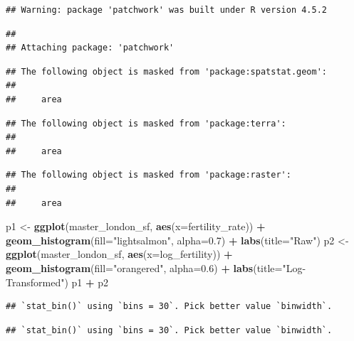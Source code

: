 \documentclass[
]{article}
\newenvironment{Shaded}{\begin{snugshade}}{\end{snugshade}}
\newcommand{\AttributeTok}[1]{\textcolor[rgb]{0.13,0.29,0.53}{#1}}
\newcommand{\FloatTok}[1]{\textcolor[rgb]{0.00,0.00,0.81}{#1}}
\newcommand{\FunctionTok}[1]{\textcolor[rgb]{0.13,0.29,0.53}{\textbf{#1}}}
\newcommand{\NormalTok}[1]{#1}
\newcommand{\OtherTok}[1]{\textcolor[rgb]{0.56,0.35,0.01}{#1}}
\newcommand{\SpecialCharTok}[1]{\textcolor[rgb]{0.81,0.36,0.00}{\textbf{#1}}}
\newcommand{\StringTok}[1]{\textcolor[rgb]{0.31,0.60,0.02}{#1}}
\begin{document}
\begin{verbatim}
## Warning: package 'patchwork' was built under R version 4.5.2
\end{verbatim}

\begin{verbatim}
## 
## Attaching package: 'patchwork'
\end{verbatim}

\begin{verbatim}
## The following object is masked from 'package:spatstat.geom':
## 
##     area
\end{verbatim}

\begin{verbatim}
## The following object is masked from 'package:terra':
## 
##     area
\end{verbatim}

\begin{verbatim}
## The following object is masked from 'package:raster':
## 
##     area
\end{verbatim}

\begin{Shaded}
\begin{Highlighting}[]
\NormalTok{p1 }\OtherTok{\textless{}{-}} \FunctionTok{ggplot}\NormalTok{(master\_london\_sf, }\FunctionTok{aes}\NormalTok{(}\AttributeTok{x=}\NormalTok{fertility\_rate)) }\SpecialCharTok{+} \FunctionTok{geom\_histogram}\NormalTok{(}\AttributeTok{fill=}\StringTok{"lightsalmon"}\NormalTok{, }\AttributeTok{alpha=}\FloatTok{0.7}\NormalTok{) }\SpecialCharTok{+} \FunctionTok{labs}\NormalTok{(}\AttributeTok{title=}\StringTok{"Raw"}\NormalTok{)}
\NormalTok{p2 }\OtherTok{\textless{}{-}} \FunctionTok{ggplot}\NormalTok{(master\_london\_sf, }\FunctionTok{aes}\NormalTok{(}\AttributeTok{x=}\NormalTok{log\_fertility)) }\SpecialCharTok{+} \FunctionTok{geom\_histogram}\NormalTok{(}\AttributeTok{fill=}\StringTok{"orangered"}\NormalTok{, }\AttributeTok{alpha=}\FloatTok{0.6}\NormalTok{) }\SpecialCharTok{+} \FunctionTok{labs}\NormalTok{(}\AttributeTok{title=}\StringTok{"Log{-}Transformed"}\NormalTok{)}
\NormalTok{p1 }\SpecialCharTok{+}\NormalTok{ p2}
\end{Highlighting}
\end{Shaded}

\begin{verbatim}
## `stat_bin()` using `bins = 30`. Pick better value `binwidth`.
\end{verbatim}

\begin{verbatim}
## `stat_bin()` using `bins = 30`. Pick better value `binwidth`.
\end{verbatim}
\end{document}
